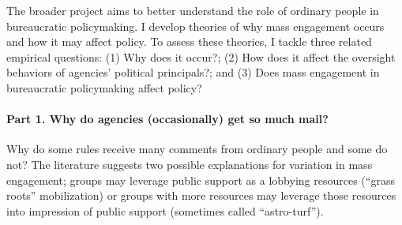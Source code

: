 The broader project aims to better understand the role of ordinary people in bureaucratic policymaking. 
I develop theories of why mass engagement occurs and how it may affect policy. To assess these theories, I tackle three related empirical questions: (1) Why does it occur?; (2) How does it affect the oversight behaviors of agencies' political principals?; and %
(3)  Does mass engagement in bureaucratic policymaking affect policy?

\paragraph{Part 1. Why do agencies (occasionally) get so much mail?} %
Why do some rules receive many comments from ordinary people and some do not?
The literature suggests two possible explanations for variation in mass engagement; groups may leverage public support as a lobbying resources (``grass roots'' mobilization) or groups with more resources may leverage those resources into impression of public support (sometimes called ``astro-turf'').
